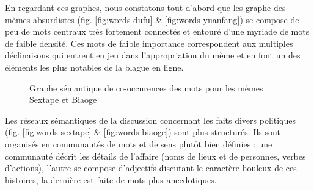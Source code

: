 En regardant ces graphes, nous constatons tout d{\textquoteright}abord que les graphe des mèmes absurdistes (fig. \ref{fig:words-dufu} \& \ref{fig:words-yuanfang}) se compose de peu de mots centraux très fortement connectés et entouré d{\textquoteright}une myriade de mots de faible densité. Ces mots de faible importance correspondent aux multiples déclinaisons qui entrent en jeu dans l'appropriation du mème et en font un des éléments les plus notables de la blague en ligne.

\begin{figure}[h!]
    \centering
    
  \caption{
    Graphe sémantique de co-occurences des mots pour les mèmes Sextape et Biaoge
  }
\end{figure}


Les réseaux sémantiques de la discussion concernant les faits divers politiques (fig. \ref{fig:words-sextape} \& \ref{fig:words-biaoge}) sont plus structurés. Ils sont organisés en communautés de mots et de sens plut\^ot bien définies : une communauté décrit les détails de l{\textquoteright}affaire (noms de lieux et de personnes, verbes d{\textquoteright}actions), l{\textquoteright}autre se compose d{\textquoteright}adjectifs discutant le caractère houleux de ces histoires, la dernière est faite de mots plus anecdotiques.

